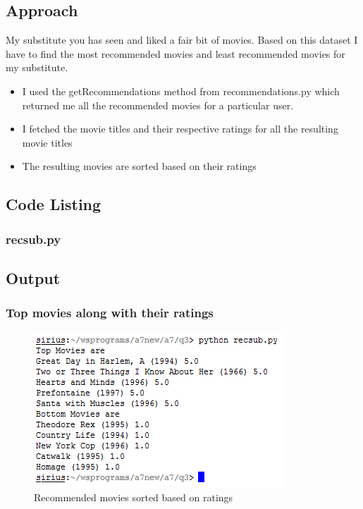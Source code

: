 \documentclass[12pt]{article}
\begin{document}
\subsection{Approach}
 My substitute you has seen and liked a fair bit of movies. Based on this dataset I have to find the most recommended movies and least recommended movies for my substitute.
\begin{itemize} 

\item I used the getRecommendations method from recommendations.py which returned me all the recommended movies for a particular user. 
\item I fetched the movie titles and their respective ratings for all the resulting movie titles
\item The resulting movies are sorted based on their ratings   
\end{itemize}
\subsection{Code Listing}
\subsubsection{recsub.py}

\newpage
\subsection{Output}
\subsubsection{Top movies along with their ratings}
\begin{figure}[ht]
\includegraphics[scale=0.9]{../../q3/output.png}
\centering
\caption{Recommended movies sorted based on ratings}
\label{Recommended movies sorted based on ratings}
\end{figure}
\end{document}
